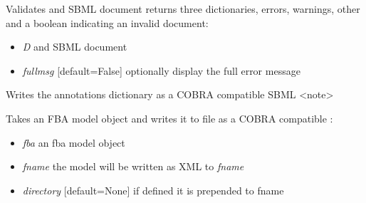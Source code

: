 \documentclass[a4paper,11pt,english]{sphinxmanual}
\begin{document}
\begin{fulllineitems}
\label{modules_doc:cbmpy.CBXML.sbml_validateDocument}
Validates and SBML document returns three dictionaries, errors, warnings, other and a boolean indicating an invalid document:
\begin{itemize}
\item {} 
\emph{D} and SBML document

\item {} 
\emph{fullmsg} {[}default=False{]} optionally display the full error message

\end{itemize}

\end{fulllineitems}


\begin{fulllineitems}
\label{modules_doc:cbmpy.CBXML.sbml_writeAnnotationsAsCOBRANote}
Writes the annotations dictionary as a COBRA compatible SBML \textless{}note\textgreater{}

\end{fulllineitems}


\begin{fulllineitems}
\label{modules_doc:cbmpy.CBXML.sbml_writeCOBRASBML}
Takes an FBA model object and writes it to file as a COBRA compatible :
\begin{itemize}
\item {} 
\emph{fba} an fba model object

\item {} 
\emph{fname} the model will be written as XML to \emph{fname}

\item {} 
\emph{directory} {[}default=None{]} if defined it is prepended to fname

\end{itemize}

\end{fulllineitems}
\end{document}
